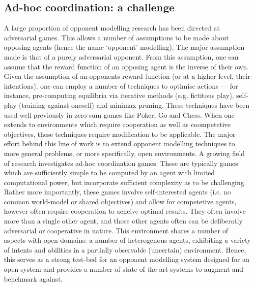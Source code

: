 \subsection{Ad-hoc coordination: a challenge}
A large proportion of opponent modelling research has been directed at adversarial games. 
This allows a number of assumptions to be made about opposing agents (hence the name `opponent' modelling). The major assumption made is that of a purely adversarial opponent. From this assumption, one can assume that the reward function of an opposing agent is the inverse of their own. Given the assumption of an opponents reward function (or at a higher level, their intentions), one can employ a number of techniques to optimise actions --- for instance, pre-computing equilibria via iterative methods (e.g. fictitous play), self-play (training against oneself) and minimax pruning. These techniques have been used well previously in zero-sum games like Poker, Go and Chess. When one extends to environments which require cooperation as well as coompetetive objectives, these techniques require modification to be applicable. 
\newline \newline
The major effort behind this line of work is to extend opponent modelling techniques to more general problems, or more specifically, open environments. A growing field of research investigates ad-hoc coordination games. These are typically games which are sufficiently simple to be computed by an agent with limited computational power, but incorporate sufficient complexity as to be challenging. Rather more importantly, these games involve self-interested agents (i.e. no common world-model or shared objectives) and allow for competetive agents, however often require cooperation to acheive optimal results. They often involve more than a single other agent, and those other agents often can be deliberatly adversarial or cooperative in nature.
\newline \newline 
This environment shares a number of aspects with open domains: a number of heterogenous agents, exhibiting a variety of intents and abilities in a partially observable (uncertain) environment. Hence, this serves as a strong test-bed for an opponent modelling system designed for an open system and provides a number of state of the art systems to augment and benchmark against. 
